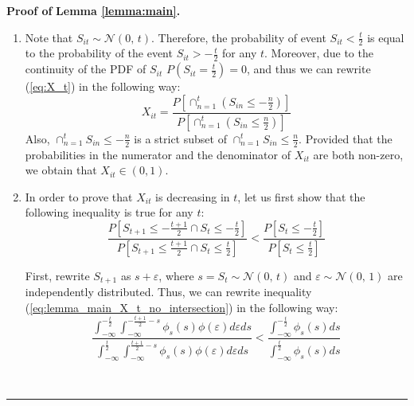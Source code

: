 \documentclass[12pt]{article}
\newenvironment{proof}[1][Proof of]{\noindent\textbf{#1} }{\ \rule{0.5em}{0.5em}}
\begin{document}
\begin{proof}
\textbf{Lemma \ref{lemma:main}.} 
\begin{enumerate}[label={\roman*})]
\item Note that $S_{it} \sim  \mathcal{N}(0,\,t)$. Therefore, the probability of event $S_{it} < \frac{t}{2}$ is equal to the probability of the event $S_{it}> -\frac{t}{2}$ for any $t$. Moreover, due to the continuity of the PDF of $S_{it}$ $P(S_{it} = \frac{t}{2}) = 0$, and thus we can rewrite (\ref{eq:X_t}) in the following way:
\begin{equation}\label{eq:lemma_main_X_t_standard}
X_{it} = \frac{P\left[ \cap_{n=1}^{t}(S_{in}\leq -\frac{n}{2}) \right] }
{P\left[ \cap_{n=1}^{t}(S_{in}\leq \frac{n}{2}) \right] }
\end{equation}
Also, $\cap_{n=1}^{t}S_{in}\leq -\frac{n}{2}$ is a strict subset of $\cap_{n=1}^{t}S_{in}\leq \frac{n}{2}$. Provided that the probabilities in  the numerator and the denominator of $X_{it}$ are both non-zero, we obtain that $X_{it} \in \left(0,1\right)$.
\item In order to prove that $X_{it}$ is decreasing in $t$, let us first show that the following inequality is true for any $t$:
\begin{equation}\label{eq:lemma_main_X_t_no_intersection}
\frac{P\left[S_{t+1}\leq-\frac{t+1}{2} \cap S_{t}\leq-\frac{t}{2} \right]}
{P\left[S_{t+1}\leq \frac{t+1}{2} \cap S_{t}\leq \frac{t}{2} \right]} 
< \frac{P\left[S_{t}\leq-\frac{t}{2} \right]}
{P\left[S_{t}\leq \frac{t}{2} \right]}
\end{equation}

First, rewrite $S_{t+1}$ as $s+\varepsilon$, where $s = S_t \sim  \mathcal{N}(0,\,t)$ and $\varepsilon \sim  \mathcal{N}(0,\,1)$ are independently distributed. Thus, we can rewrite inequality (\ref{eq:lemma_main_X_t_no_intersection}) in the following way:
\begin{equation}\label{eq:main_lemma_rhs_X_t_no_intersection}
\frac{\int_{-\infty}^{-\frac{t}{2}}\int_{-\infty}^{-\frac{t+1}{2}-s}\phi_{s}(s)\phi(\varepsilon)d\varepsilon ds}
{\int_{-\infty}^{\frac{t}{2}}\int_{-\infty}^{\frac{t+1}{2}-s}\phi_{s}(s)\phi(\varepsilon)d\varepsilon ds}
<
\frac{\int_{-\infty}^{-\frac{t}{2}}\phi_{s}(s)ds}
{\int_{-\infty}^{\frac{t}{2}}\phi_{s}(s)ds}
\end{equation}


\end{enumerate}
\end{proof}
\end{document}
